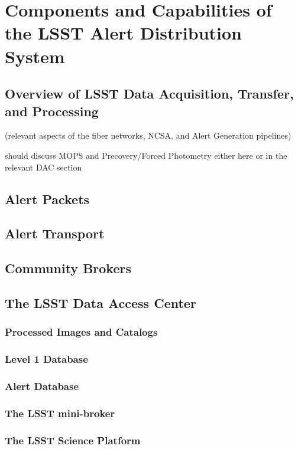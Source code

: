 \section{Components and Capabilities of the LSST Alert Distribution System}


\subsection{Overview of LSST Data Acquisition, Transfer, and Processing}

(relevant aspects of the fiber networks, NCSA, and Alert Generation pipelines)

should discuss MOPS and Precovery/Forced Photometry either here or in the relevant DAC section


\subsection{Alert Packets}


\subsection{Alert Transport}

\subsection{Community Brokers}

\subsection{The LSST Data Access Center}

\subsubsection{Processed Images and Catalogs}

\subsubsection{Level 1 Database}

\subsubsection{Alert Database}

\subsubsection{The LSST mini-broker}

\subsubsection{The LSST Science Platform}

